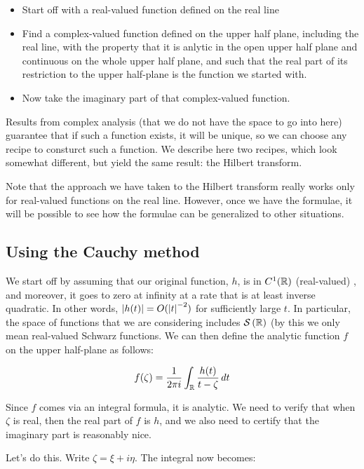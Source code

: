\documentclass[a4paper]{amsart}
\newcommand{\schwarz}[1]{\mathcal{S}\left(#1\right)}
\begin{document}
\begin{itemize}

\item Start off with a real-valued function defined on the real line

\item Find a complex-valued function defined on the upper half plane,
  including the real line, with the property that it is anlytic in the
  open upper half plane and continuous on the whole upper half plane,
  and such that the real part of its restriction to the upper
  half-plane is the function we started with.
\item Now take the imaginary part of that complex-valued function.

\end{itemize}

Results from complex analysis (that we do not have the space to go
into here) guarantee that if such a function exists, it will be
unique, so we can choose any recipe to consturct such a function. We
describe here two recipes, which look somewhat different, but yield
the same result: the Hilbert transform.

Note that the approach we have taken to the Hilbert transform really
works only for real-valued functions on the real line. However, once
we have the formulae, it will be possible to see how the formulae can
be generalized to other situations.

\subsection{Using the Cauchy method}

We start off by assuming that our original function, $h$, is in
$C^1(\mathbb{R})$ (real-valued) , and moreover, it goes to zero at infinity at
a rate that is at least inverse quadratic. In other words, $\left|h(t)\right|
= O(\left|t\right|^{-2})$ for sufficiently large $t$. In particular, the
space of functions that we are considering includes $\schwarz{\R}$ (by
this we only mean real-valued Schwarz functions. We can then define the analytic function $f$ on the upper half-plane as follows:

$$f(\zeta) = \frac{1}{2\pi i} \int_{\mathbb{R}} \frac{h(t)}{t - \zeta} \, dt$$

Since $f$ comes via an integral formula, it is analytic. We need to
verify that when $\zeta$ is real, then the real part of $f$ is $h$, and
we also need to certify that the imaginary part is reasonably nice.

Let's do this. Write $\zeta = \xi + i\eta$. The integral now becomes:
\end{document}
